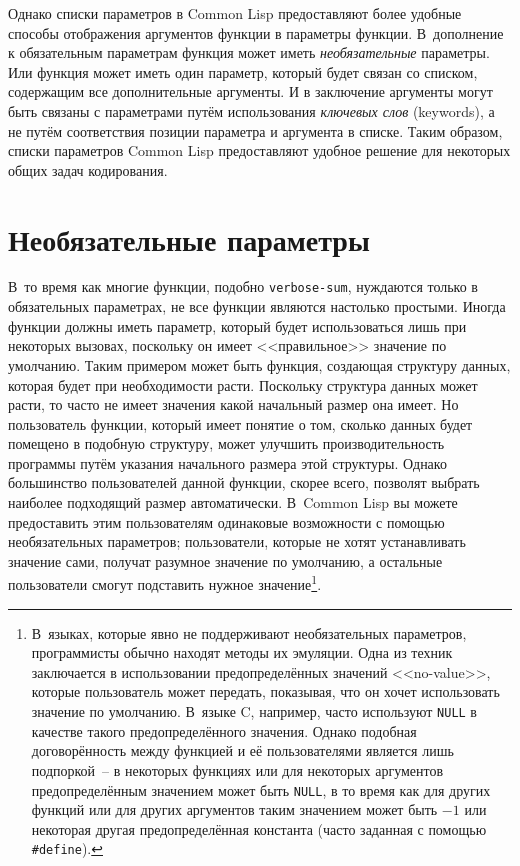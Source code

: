 Однако списки параметров в Common Lisp предоставляют более удобные способы отображения
аргументов функции в параметры функции.  В~дополнение к обязательным параметрам функция
может иметь \textit{необязательные} параметры.  Или функция может иметь один параметр,
который будет связан со списком, содержащим все дополнительные аргументы.  И в заключение
аргументы могут быть связаны с параметрами путём использования \textit{ключевых слов}
(keywords), а не путём соответствия позиции параметра и аргумента в списке.  Таким
образом, списки параметров Common Lisp предоставляют удобное решение для некоторых общих
задач кодирования.

\section{Необязательные параметры}

В~то время как многие функции, подобно \lstinline{verbose-sum}, нуждаются только в
обязательных параметрах, не все функции являются настолько простыми.  Иногда функции
должны иметь параметр, который будет использоваться лишь при некоторых вызовах, поскольку
он имеет <<правильное>> значение по умолчанию.  Таким примером может быть функция,
создающая структуру данных, которая будет при необходимости расти.  Поскольку структура
данных может расти, то часто не имеет значения какой начальный размер она имеет.  Но
пользователь функции, который имеет понятие о том, сколько данных будет помещено в
подобную структуру, может улучшить производительность программы путём указания начального
размера этой структуры.  Однако большинство пользователей данной функции, скорее всего,
позволят выбрать наиболее подходящий размер автоматически.  В~Common Lisp вы можете
предоставить этим пользователям одинаковые возможности с помощью необязательных
параметров; пользователи, которые не хотят устанавливать значение сами, получат разумное
значение по умолчанию, а остальные пользователи смогут подставить нужное
значение\footnote{В~языках, которые явно не поддерживают необязательных параметров,
  программисты обычно находят методы их эмуляции.  Одна из техник заключается в
  использовании предопределённых значений <<no-value>>, которые пользователь может
  передать, показывая, что он хочет использовать значение по умолчанию.  В~языке C,
  например, часто используют \lstinline{NULL} в качестве такого предопределённого
  значения.  Однако подобная договорённость между функцией и её пользователями является
  лишь подпоркой~-- в некоторых функциях или для некоторых аргументов предопределённым
  значением может быть \lstinline{NULL}, в то время как для других функций или для других
  аргументов таким значением может быть $-1$ или некоторая другая предопределённая
  константа (часто заданная с помощью \lstinline!#define!).}\hspace{\footnotenegspace}.

